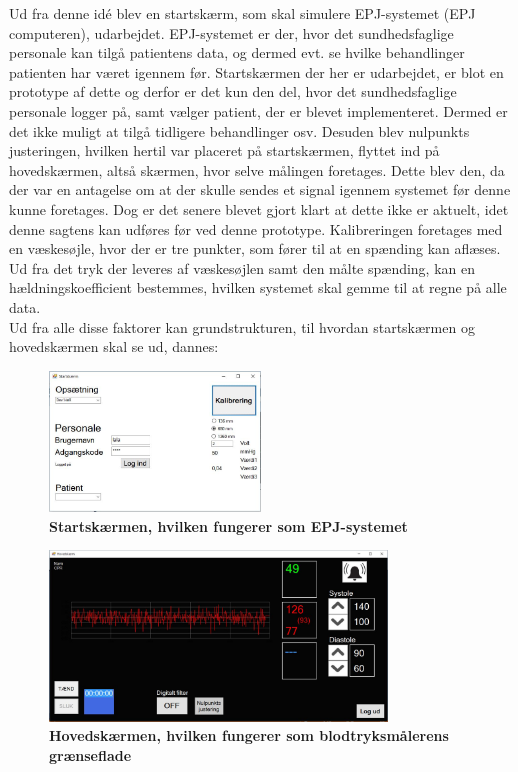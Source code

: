Ud fra denne idé blev en startskærm, som skal simulere EPJ-systemet (EPJ computeren), udarbejdet. EPJ-systemet er der, hvor det sundhedsfaglige personale kan tilgå patientens data, og dermed evt. se hvilke behandlinger patienten har været igennem før. Startskærmen der her er udarbejdet, er blot en prototype af dette og derfor er det kun den del, hvor det sundhedsfaglige personale logger på, samt vælger patient, der er blevet implementeret. Dermed er det ikke muligt at tilgå tidligere behandlinger osv. Desuden blev nulpunkts justeringen, hvilken hertil var placeret på startskærmen, flyttet ind på hovedskærmen, altså skærmen, hvor selve målingen foretages. Dette blev den, da der var en antagelse om at der skulle sendes et signal igennem systemet før denne kunne foretages. Dog er det senere blevet gjort klart at dette ikke er aktuelt, idet denne sagtens kan udføres før ved denne prototype. Kalibreringen foretages med en væskesøjle, hvor der er tre punkter, som fører til at en spænding kan aflæses. Ud fra det tryk der leveres af væskesøjlen samt den målte spænding, kan en hældningskoefficient bestemmes, hvilken systemet skal gemme til at regne på alle data.\\
Ud fra alle disse faktorer kan grundstrukturen, til hvordan startskærmen og hovedskærmen skal se ud, dannes:
\begin{figure}[H]
\includegraphics[width =0.5\textwidth , center]{billeder/SkitseStartNy}
\caption{\textbf{Startskærmen, hvilken fungerer som EPJ-systemet}}
\end{figure}
\begin{figure}[H]
\includegraphics[width =0.8\textwidth , center]{billeder/SkitseHovedNy}
\caption{\textbf{Hovedskærmen, hvilken fungerer som blodtryksmålerens grænseflade}}
\end{figure}
